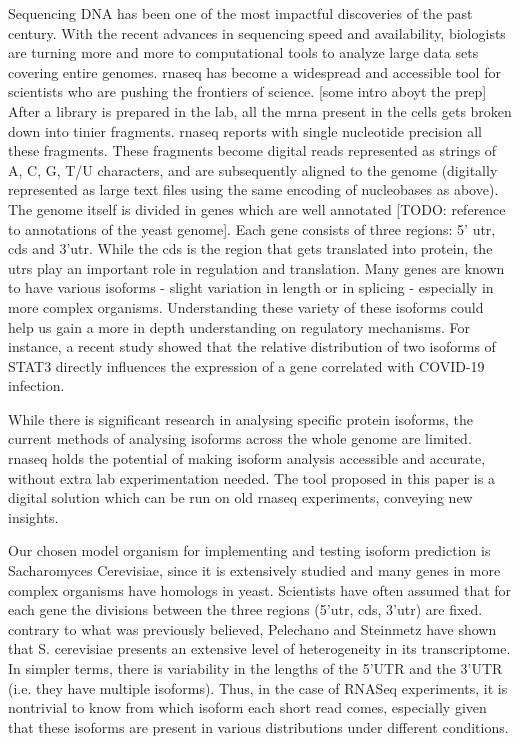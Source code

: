 \documentclass[12pt]{article}
\begin{document}
Sequencing DNA has been one of the most impactful discoveries of the past century. With the recent advances \cite{Ingolia2012} in sequencing speed and availability, biologists are turning more and more to computational tools to analyze large data sets covering entire genomes. \gls{rnaseq} has become a widespread and accessible tool for scientists who are pushing the frontiers of science. [some intro aboyt the prep] After a library is prepared in the lab, all the \gls{mrna} present in the cells gets broken down into tinier fragments. \acrshort{rnaseq} reports with single nucleotide precision all these fragments. These fragments become digital reads represented as strings of A, C, G, T/U characters, and are subsequently aligned to the genome (digitally represented as large text files using the same encoding of nucleobases as above). The genome itself is divided in genes which are well annotated {\tiny[TODO: reference to annotations of the yeast genome]}. Each gene consists of three regions: 5’ \gls{utr}, \gls{cds} and 3’\acrshort{utr}. While the \acrshort{cds} is the region that gets translated into protein, the \acrshort{utr}s play an important role in regulation and translation. Many genes are known to have various isoforms - slight variation in length or in splicing - especially in more complex organisms. Understanding these variety of these isoforms could help us gain a more in depth understanding on regulatory mechanisms. For instance, a recent study \cite{Shamir2020} showed that 
the relative distribution of two isoforms of STAT3 directly influences the expression of a gene correlated with COVID-19 infection. 

While there is significant research in analysing specific protein isoforms, the current methods of analysing isoforms across the whole genome are limited. \acrshort{rnaseq} holds the potential of making isoform analysis accessible and accurate, without extra lab experimentation needed. The tool proposed in this paper is a digital solution which can be run on old \acrshort{rnaseq} experiments, conveying new insights.

Our chosen model organism for implementing and testing isoform prediction is Sacharomyces Cerevisiae, since it is extensively studied and many genes in more complex organisms have homologs in yeast. Scientists have often assumed that for each gene the divisions between the three regions (5'\acrshort{utr}, \acrshort{cds}, 3'\acrshort{utr}) are fixed. contrary to what was previously believed, Pelechano and Steinmetz \cite{Pelechano2013} have shown that S. cerevisiae presents an extensive level of heterogeneity in its transcriptome. In simpler terms, there is variability in the lengths of the 5’UTR and the 3’UTR (i.e. they have multiple isoforms). Thus, in the case of RNASeq experiments, it is nontrivial to know from which isoform each short read comes, especially given that these isoforms are present in various distributions under different conditions. 
\end{document}
